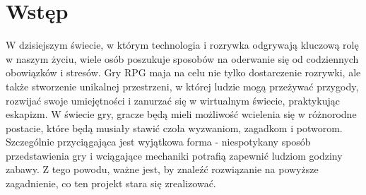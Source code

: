 ﻿\chapter*{Wstęp}

W dzisiejszym świecie, w którym technologia i rozrywka odgrywają kluczową rolę w naszym życiu, wiele osób poszukuje sposobów na oderwanie się od codziennych obowiązków i stresów. 
Gry RPG maja na celu nie tylko dostarczenie rozrywki, ale także stworzenie unikalnej przestrzeni, w której ludzie mogą przeżywać przygody, rozwijać swoje umiejętności i zanurzać się w wirtualnym świecie, praktykując eskapizm.
W świecie gry, gracze będą mieli możliwość wcielenia się w różnorodne postacie, które będą musiały stawić czoła wyzwaniom, zagadkom i potworom.
Szczególnie przyciągająca jest wyjątkowa forma - niespotykany sposób przedstawienia gry i wciągające mechaniki potrafią zapewnić ludziom godziny zabawy.
Z tego powodu, ważne jest, by znaleźć rozwiązanie na powyższe zagadnienie, co ten projekt stara się zrealizować.